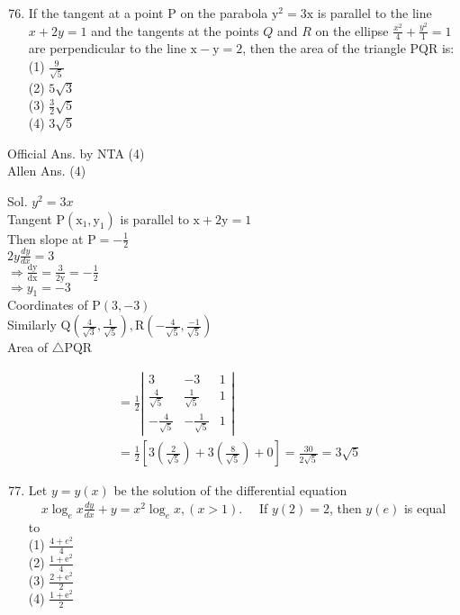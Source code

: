 \documentclass[10pt]{article}
\begin{document}
\begin{enumerate}
  \setcounter{enumi}{75}
  \item If the tangent at a point P on the parabola \(\mathrm{y}^{2}=3 \mathrm{x}\) is parallel to the line \(x+2 y=1\) and the tangents at the points \(Q\) and \(R\) on the ellipse \(\frac{x^{2}}{4}+\frac{y^{2}}{1}=1\) are perpendicular to the line \(\mathrm{x}-\mathrm{y}=2\), then the area of the triangle PQR is:\\
(1) \(\frac{9}{\sqrt{5}}\)\\
(2) \(5 \sqrt{3}\)\\
(3) \(\frac{3}{2} \sqrt{5}\)\\
(4) \(3 \sqrt{5}\)
\end{enumerate}

Official Ans. by NTA (4)\\
Allen Ans. (4)

Sol. \(y^{2}=3 x\)\\
Tangent \(\mathrm{P}\left(\mathrm{x}_{1}, \mathrm{y}_{1}\right)\) is parallel to \(\mathrm{x}+2 \mathrm{y}=1\)\\
Then slope at \(\mathrm{P}=-\frac{1}{2}\)\\
\(2 y \frac{d y}{d x}=3\)\\
\(\Rightarrow \frac{\mathrm{dy}}{\mathrm{dx}}=\frac{3}{2 \mathrm{y}}=-\frac{1}{2}\)\\
\(\Rightarrow y_{1}=-3\)\\
Coordinates of \(\mathrm{P}(3,-3)\)\\
Similarly \(\mathrm{Q}\left(\frac{4}{\sqrt{3}}, \frac{1}{\sqrt{5}}\right), \mathrm{R}\left(-\frac{4}{\sqrt{5}}, \frac{-1}{\sqrt{5}}\right)\)\\
Area of \(\triangle \mathrm{PQR}\)

\[
\begin{aligned}
& =\frac{1}{2}\left|\begin{array}{ccc}
3 & -3 & 1 \\
\frac{4}{\sqrt{5}} & \frac{1}{\sqrt{5}} & 1 \\
-\frac{4}{\sqrt{5}} & -\frac{1}{\sqrt{5}} & 1
\end{array}\right| \\
& =\frac{1}{2}\left[3\left(\frac{2}{\sqrt{5}}\right)+3\left(\frac{8}{\sqrt{5}}\right)+0\right]=\frac{30}{2 \sqrt{5}}=3 \sqrt{5}
\end{aligned}
\]

\begin{enumerate}
  \setcounter{enumi}{76}
  \item Let \(y=y(x)\) be the solution of the differential equation \(\quad x \log _{e} x \frac{d y}{d x}+y=x^{2} \log _{e} x,(x>1) . \quad\) If \(y(2)=2\), then \(y(e)\) is equal to\\
(1) \(\frac{4+e^{2}}{4}\)\\
(2) \(\frac{1+\mathrm{e}^{2}}{4}\)\\
(3) \(\frac{2+\mathrm{e}^{2}}{2}\)\\
(4) \(\frac{1+\mathrm{e}^{2}}{2}\)
\end{enumerate}
\end{document}
